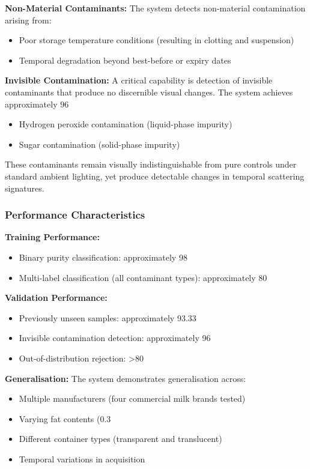 \documentclass[11pt,a4paper]{article}
\begin{document}
\begin{enumerate}[leftmargin=*,label=\alph*)]
\textbf{Non-Material Contaminants:}
The system detects non-material contamination arising from:
\begin{itemize}[leftmargin=*]
\item Poor storage temperature conditions (resulting in clotting and suspension)
\item Temporal degradation beyond best-before or expiry dates
\end{itemize}

\textbf{Invisible Contamination:}
A critical capability is detection of invisible contaminants that produce no discernible visual changes. The system achieves approximately 96%
\begin{itemize}[leftmargin=*]
\item Hydrogen peroxide contamination (liquid-phase impurity)
\item Sugar contamination (solid-phase impurity)
\end{itemize}

These contaminants remain visually indistinguishable from pure controls under standard ambient lighting, yet produce detectable changes in temporal scattering signatures.

\subsubsection{Performance Characteristics}

\textbf{Training Performance:}
\begin{itemize}[leftmargin=*]
\item Binary purity classification: approximately 98%
\item Multi-label classification (all contaminant types): approximately 80%
\end{itemize}

\textbf{Validation Performance:}
\begin{itemize}[leftmargin=*]
\item Previously unseen samples: approximately 93.33%
\item Invisible contamination detection: approximately 96%
\item Out-of-distribution rejection: >80%
\end{itemize}

\textbf{Generalisation:}
The system demonstrates generalisation across:
\begin{itemize}[leftmargin=*]
\item Multiple manufacturers (four commercial milk brands tested)
\item Varying fat contents (0.3%
\item Different container types (transparent and translucent)
\item Temporal variations in acquisition
\end{itemize}


\end{enumerate}
\end{document}
